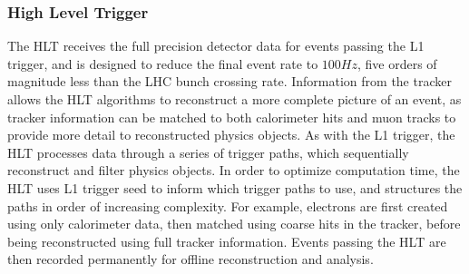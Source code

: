 \subsubsection{High Level Trigger} \label{sec:CMS_HLT}
The HLT receives the full precision detector data for events passing the L1 trigger, and is designed to reduce the final event rate to $100\unit{Hz}$, five orders of magnitude less than the LHC bunch crossing rate. Information from the tracker allows the HLT algorithms to reconstruct a more complete picture of an event, as tracker information can be matched to both calorimeter hits and muon tracks to provide more detail to reconstructed physics objects. As with the L1 trigger, the HLT processes data through a series of trigger paths, which sequentially reconstruct and filter physics objects. In order to optimize computation time, the HLT uses L1 trigger seed to inform which trigger paths to use, and structures the paths in order of increasing complexity. For example, electrons are first created using only calorimeter data, then matched using coarse hits in the tracker, before being reconstructed using full tracker information. Events passing the HLT are then recorded permanently for offline reconstruction and analysis. 